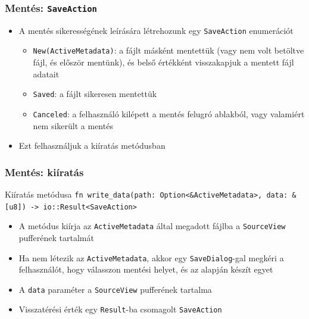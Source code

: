 \documentclass{beamer}
\begin{document}
    \begin{frame}[fragile]
        \frametitle{Mentés: \texttt{SaveAction}}

        \begin{itemize}
            \item A mentés sikerességének leírására létrehozunk egy \texttt{SaveAction} enumerációt \begin{itemize}
                \item \texttt{New(ActiveMetadata)}: a fájlt másként mentettük (vagy nem volt betöltve fájl, és először mentünk), és belső értékként visszakapjuk a mentett fájl adatait
                \item \texttt{Saved}: a fájlt sikeresen mentettük
                \item \texttt{Canceled}: a felhasználó kilépett a mentés felugró ablakból, vagy valamiért nem sikerült a mentés
            \end{itemize}
            \item Ezt felhasználjuk a kiíratás metódusban
        \end{itemize}
    \end{frame}

    \begin{frame}[fragile]
        \frametitle{Mentés: kiíratás}

        \begin{block}{Kiíratás metódusa}
            \texttt{fn write\_data(path: Option<\&ActiveMetadata>, data: \&[u8]) -> io::Result<SaveAction>}
        \end{block}

        \begin{itemize}
            \item A metódus kiírja az \texttt{ActiveMetadata} által megadott fájlba a \texttt{SourceView} pufferének tartalmát
            \item Ha nem létezik az \texttt{ActiveMetadata}, akkor egy \texttt{SaveDialog}-gal megkéri a felhasználót, hogy válasszon mentési helyet, és az alapján készít egyet
            \item A \texttt{data} paraméter a \texttt{SourceView} pufferének tartalma
            \item Visszatérési érték egy \texttt{Result}-ba csomagolt \texttt{SaveAction}
        \end{itemize}
    \end{frame}
\end{document}

